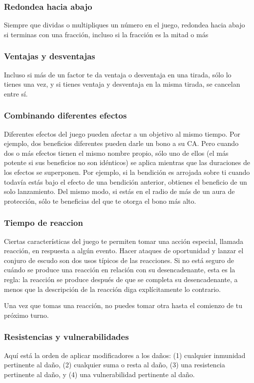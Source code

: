 \documentclass[a4paper,twocolumn,openany,10pt]{dndbook}
\begin{document}
\subsubsection{Redondea hacia abajo}
Siempre que dividas o multipliques un número en el juego, redondea hacia abajo si terminas con una fracción, incluso si la
fracción es la mitad o más

\subsubsection{Ventajas y  desventajas}
Incluso si más de un factor te da ventaja o desventaja en una tirada, sólo lo tienes una vez, y si tienes ventaja y desventaja en
la misma tirada, se cancelan entre sí.

\subsubsection{Combinando diferentes efectos}
Diferentes efectos del juego pueden afectar a un objetivo al mismo tiempo. Por ejemplo, dos beneficios diferentes pueden darle un
bono a su CA. Pero cuando dos o más efectos tienen el mismo nombre propio, sólo uno de ellos (el más potente si sus beneficios no
son idénticos) se aplica mientras que las duraciones de los efectos se superponen. Por ejemplo, si la bendición es arrojada sobre
ti cuando todavía estás bajo el efecto de una bendición anterior, obtienes el beneficio de un solo lanzamiento. Del mismo modo,
si estás en el radio de más de un aura de protección, sólo te beneficias del que te otorga el bono más alto.

\subsubsection{Tiempo de reaccion}
Ciertas características del juego te permiten tomar una acción especial, llamada reacción, en respuesta a algún evento. Hacer
ataques de oportunidad y lanzar el conjuro de escudo son dos usos típicos de las reacciones. Si no está seguro de cuándo se
produce una reacción en relación con su desencadenante, esta es la regla: la reacción se produce después de que se completa su
desencadenante, a menos que la descripción de la reacción diga explícitamente lo contrario.

Una vez que tomas una reacción, no puedes tomar otra hasta el comienzo de tu próximo turno.

\subsubsection{Resistencias y vulnerabilidades}
Aquí está la orden de aplicar modificadores a los daños: (1) cualquier inmunidad pertinente al daño, (2) cualquier suma o resta
al daño, (3) una resistencia pertinente al daño, y (4) una vulnerabilidad pertinente al daño. 
\end{document}
